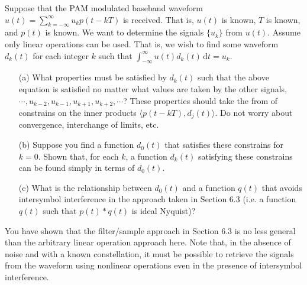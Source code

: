 \documentclass{assignment}
\begin{document}
\begin{prob}[6.4, Nyquist]
    Suppose that the PAM modulated baseband waveform $u(t)=\sum_{k=-\infty}^{\infty}u_kp(t-kT)$ is received. That is, $u(t)$ is known, $T$ is known, and $p(t)$ is known. We want to determine the signals $\{u_k\}$ from $u(t)$. Assume only linear operations can be used. That is, we wish to find some waveform $d_k(t)$ for each integer $k$ such that $\int_{-\infty}^{\infty}u(t)d_k(t)\,\mathrm{d}t=u_k$.
    \begin{itemize}
        \item[(a)] What properties must be satisfied by $d_k(t)$ such that the above equation is satisfied no matter what values are taken by the other signals, $\cdots,u_{k-2},u_{k-1},u_{k+1},u_{k+2},\cdots$? These properties should take the from of constrains on the inner products $\langle p(t-kT),d_j(t)\rangle$. Do not worry about convergence, interchange of limits, etc.
        \item[(b)] Suppose you find a function $d_0(t)$ that satisfies these constrains for $k=0$. Shown that, for each $k$, a function $d_k(t)$ satisfying these constrains can be found simply in terms of $d_0(t)$.
        \item[(c)] What is the relationship between $d_0(t)$ and a function $q(t)$ that avoids intersymbol interference in the approach taken in Section 6.3 (i.e. a function $q(t)$ such that $p(t)*q(t)$ is ideal Nyquist)?
    \end{itemize}
    You have shown that the filter/sample approach in Section 6.3 is no less general than the arbitrary linear operation approach here. Note that, in the absence of noise and with a known constellation, it must be possible to retrieve the signals from the waveform using nonlinear operations even in the presence of intersymbol interference.
\end{prob}
\end{document}
